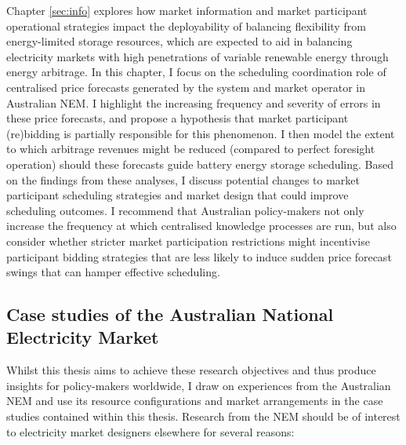 \documentclass[12pt,a4paper,]{report}
\begin{document}
Chapter \ref{sec:info} explores how market information and market
participant operational strategies impact the deployability of balancing
flexibility from energy-limited storage resources, which are expected to
aid in balancing electricity markets with high penetrations of variable
renewable energy through energy arbitrage. In this chapter, I focus on
the scheduling coordination role of centralised price forecasts
generated by the system and market operator in Australian NEM. I
highlight the increasing frequency and severity of errors in these price
forecasts, and propose a hypothesis that market participant (re)bidding
is partially responsible for this phenomenon. I then model the extent to
which arbitrage revenues might be reduced (compared to perfect foresight
operation) should these forecasts guide battery energy storage
scheduling. Based on the findings from these analyses, I discuss
potential changes to market participant scheduling strategies and market
design that could improve scheduling outcomes. I recommend that
Australian policy-makers not only increase the frequency at which
centralised knowledge processes are run, but also consider whether
stricter market participation restrictions might incentivise participant
bidding strategies that are less likely to induce sudden price forecast
swings that can hamper effective scheduling.

\hypertarget{case-studies-of-the-australian-national-electricity-market}{%
\subsection{Case studies of the Australian National Electricity
Market}\label{case-studies-of-the-australian-national-electricity-market}}

Whilst this thesis aims to achieve these research objectives and thus
produce insights for policy-makers worldwide, I draw on experiences from
the Australian NEM and use its resource configurations and market
arrangements in the case studies contained within this thesis. Research
from the NEM should be of interest to electricity market designers
elsewhere for several reasons:
\end{document}
